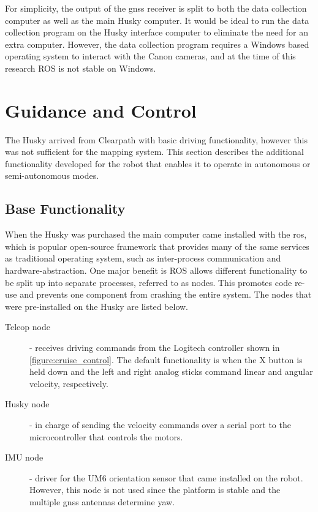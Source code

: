 For simplicity, the output of the \ac{gnss} receiver is split to both the data collection computer as well as the main Husky computer.  It would be ideal to run the data collection program on the Husky interface computer to eliminate the need for an extra computer.  However, the data collection program requires a Windows based operating system to interact with the Canon cameras, and at the time of this research ROS is not stable on Windows. 

\section{Guidance and Control}

The Husky arrived from Clearpath with basic driving functionality, however this was not sufficient for the mapping system.  This section describes the additional functionality developed for the robot that enables it to operate in autonomous or semi-autonomous modes.  

\subsection{Base Functionality}
\label{section:base_functionality}

When the Husky was purchased the main computer came installed with the \acl{ros}, which is popular open-source framework that provides many of the same services as traditional operating system, such as inter-process communication and hardware-abstraction.  One major benefit is ROS allows different functionality to be split up into separate processes, referred to as nodes.  This promotes code re-use and prevents one component from crashing the entire system.   The nodes that were pre-installed on the Husky are listed below.

\begin{description}
\item[Teleop node] - receives driving commands from the Logitech controller shown in \ref{figure:cruise_control}.  The default functionality is when the X button is held down and the left and right analog sticks command linear and angular velocity, respectively.
\item[Husky node] - in charge of sending the velocity commands over a serial port to the microcontroller that controls the motors.  
\item[IMU node] - driver for the UM6 orientation sensor that came installed on the robot.  However, this node is not used since the platform is stable and the multiple \ac{gnss} antennas determine yaw.
\end{description}

